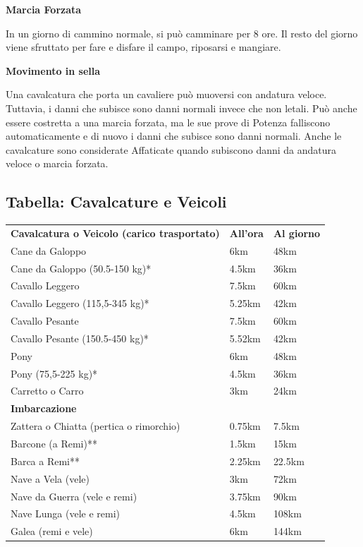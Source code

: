 \documentclass[a4paper,11pt,twoside,openany]{book}
\begin{document}
{\bigskip

\textbf{Marcia Forzata}

In un giorno di cammino normale, si può camminare per 8 ore. Il resto del giorno viene sfruttato per fare e disfare il campo, riposarsi e mangiare.

\textbf{Movimento in sella}

Una cavalcatura che porta un cavaliere può muoversi con andatura veloce. Tuttavia, i danni che subisce sono danni normali invece che non letali. Può anche essere costretta a una marcia forzata, ma le sue prove di Potenza falliscono automaticamente e di nuovo i danni che subisce sono danni normali. Anche le cavalcature sono considerate Affaticate quando subiscono danni da andatura veloce o marcia forzata.

\subsection{Tabella: Cavalcature e Veicoli}

\medskip

\label{tabella-cavalcature-e-veicoli}

\begin{tabular}{lll}
\toprule
\textbf{Cavalcatura o Veicolo (carico trasportato)} & \textbf{All'ora} & \textbf{Al giorno}\tabularnewline
Cane da Galoppo &6km &48km\\
Cane da Galoppo (50.5-150 kg)* &4.5km& 36km\\
Cavallo Leggero& 7.5km &60km\\
Cavallo Leggero (115,5-345 kg)* &5.25km &42km\\
Cavallo Pesante &7.5km &60km\\
Cavallo Pesante (150.5-450 kg)* &5.52km& 42km\\
Pony &6km &48km\\
Pony (75,5-225 kg)* &4.5km &36km\\
Carretto o Carro &3km &24km\\
\textbf{Imbarcazione} &&\\
Zattera o Chiatta (pertica o rimorchio) & 0.75km &7.5km\\
Barcone (a Remi)** &1.5km &15km\\
Barca a Remi** &2.25km& 22.5km\\
Nave a Vela (vele) &3km &72km\\
Nave da Guerra (vele e remi) &3.75km& 90km\\
Nave Lunga (vele e remi) &4.5km& 108km\\
Galea (remi e vele) &6km& 144km\\
\end{tabular}

}
\end{document}

